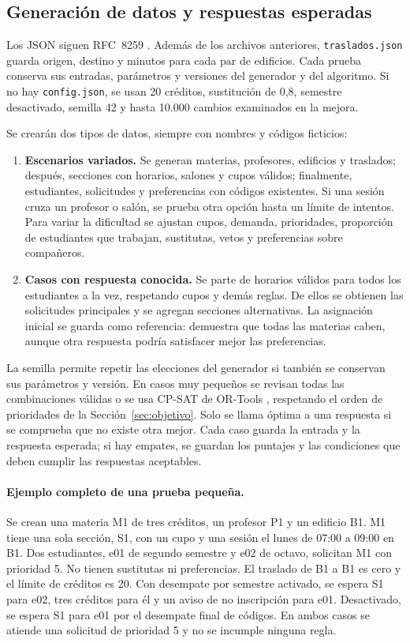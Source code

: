 \subsection{Generación de datos y respuestas esperadas}

Los JSON siguen RFC~8259 \cite{json}. Además de los archivos anteriores, \texttt{traslados.json} guarda origen, destino y minutos para cada par de edificios. Cada prueba conserva sus entradas, parámetros y versiones del generador y del algoritmo. Si no hay \texttt{config.json}, se usan 20 créditos, sustitución de 0,8, semestre desactivado, semilla 42 y hasta 10.000 cambios examinados en la mejora.

Se crearán dos tipos de datos, siempre con nombres y códigos ficticios:
\begin{enumerate}
\item \textbf{Escenarios variados.} Se generan materias, profesores, edificios y traslados; después, secciones con horarios, salones y cupos válidos; finalmente, estudiantes, solicitudes y preferencias con códigos existentes. Si una sesión cruza un profesor o salón, se prueba otra opción hasta un límite de intentos. Para variar la dificultad se ajustan cupos, demanda, prioridades, proporción de estudiantes que trabajan, sustitutas, vetos y preferencias sobre compañeros.
\item \textbf{Casos con respuesta conocida.} Se parte de horarios válidos para todos los estudiantes a la vez, respetando cupos y demás reglas. De ellos se obtienen las solicitudes principales y se agregan secciones alternativas. La asignación inicial se guarda como referencia: demuestra que todas las materias caben, aunque otra respuesta podría satisfacer mejor las preferencias.
\end{enumerate}

La semilla permite repetir las elecciones del generador si también se conservan sus parámetros y versión. En casos muy pequeños se revisan todas las combinaciones válidas o se usa CP-SAT de OR-Tools \cite{cpsat}, respetando el orden de prioridades de la Sección~\ref{sec:objetivo}. Solo se llama óptima a una respuesta si se comprueba que no existe otra mejor. Cada caso guarda la entrada y la respuesta esperada; si hay empates, se guardan los puntajes y las condiciones que deben cumplir las respuestas aceptables.

\paragraph{Ejemplo completo de una prueba pequeña.}
Se crean una materia M1 de tres créditos, un profesor P1 y un edificio B1. M1 tiene una sola sección, S1, con un cupo y una sesión el lunes de 07:00 a 09:00 en B1. Dos estudiantes, e01 de segundo semestre y e02 de octavo, solicitan M1 con prioridad 5. No tienen sustitutas ni preferencias. El traslado de B1 a B1 es cero y el límite de créditos es 20. Con desempate por semestre activado, se espera S1 para e02, tres créditos para él y un aviso de no inscripción para e01. Desactivado, se espera S1 para e01 por el desempate final de códigos. En ambos casos se atiende una solicitud de prioridad 5 y no se incumple ninguna regla.

